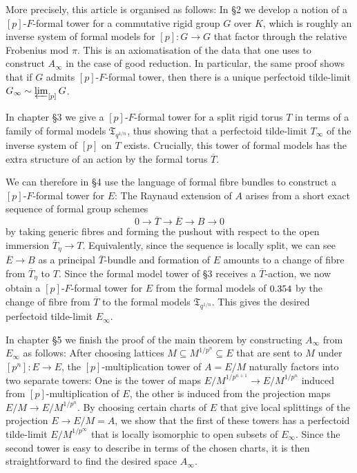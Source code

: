 \documentclass[10pt,oneside]{amsart}
\theoremstyle{definition}
\begin{document}
More precisely, this article is organised as follows: In \S2 we develop a notion of a $[p]$-$F$-formal tower for a commutative rigid group $G$ over $K$, which is roughly an inverse system of formal models for $[p]:G\rightarrow G$ that factor through the relative Frobenius mod $\pi$. This is an axiomatisation of the data that one uses to construct $A_\infty$ in the case of good reduction. In particular, the same proof shows that if $G$ admits $[p]$-$F$-formal tower, then there is a unique perfectoid tilde-limit $G_\infty \sim  \varprojlim_{[p]} G$.
 
In chapter \S3 we give a $[p]$-$F$-formal tower for a  split rigid torus $T$ in terms of a family of formal models $\mathfrak T_{q^{1/n}}$, thus showing that a perfectoid tilde-limit $T_\infty$ of the inverse system of $[p]$ on $T$ exists. Crucially, this tower of formal models has the extra structure of an action by the formal torus $\overline{T}$.
 
We can therefore in \S4 use the language of formal fibre bundles to construct a  $[p]$-$F$-formal tower for $E$: The Raynaud extension of $A$ arises from a short exact sequence of formal group schemes
\[0\rightarrow \overline{T}\rightarrow \overline{E}\rightarrow B\rightarrow 0\]
by taking generic fibres and forming the pushout with respect to the open immersion $\overline{T}_\eta\rightarrow T$. Equivalently, since the sequence is locally split, we can see $\overline{E}\rightarrow B$ as a principal $\overline{T}$-bundle and formation of $E$ amounts to a change of fibre from $\overline{T}_\eta$ to $T$. Since the formal model tower of \S3 receives a $\overline{T}$-action, we now obtain a $[p]$-$F$-formal tower for $E$ from the formal models of $\S 4$ by the change of fibre from $\overline{T}$ to the formal models $\mathfrak T_{q^{1/n}}$. This gives the desired perfectoid tilde-limit $E_\infty$.

In chapter \S5 we finish the proof of the main theorem by constructing $A_\infty$ from $E_\infty$ as follows: After choosing lattices $M\subseteq M^{1/p^n}\subseteq E$ that are sent to $M$ under $[p^n]:E\rightarrow E$, the $[p]$-multiplication tower of $A=E/M$ naturally factors into two separate towers: One is the tower of maps $E/M^{1/p^{n+1}}\rightarrow E/M^{1/p^{n}}$ induced from $[p]$-multiplication of $E$, the other is induced from the projection maps $E/M\rightarrow E/M^{1/p^n}$. By choosing certain charts of $E$ that give local splittings of the projection $E\rightarrow E/M=A$, we show that the first of these towers has a perfectoid tilde-limit $E/M^{1/p^\infty}$ that is locally isomorphic to open subsets of $E_\infty$. Since the second tower is easy to describe in terms of the chosen charts, it is then straightforward to find the desired space $A_\infty$.
 
\end{document}
